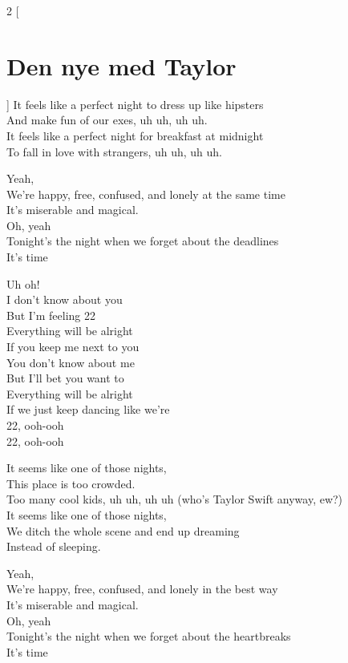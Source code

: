 \begin{multicols}{2}
[\section*{Den nye med Taylor}]
It feels like a perfect night to dress up like hipsters\\
And make fun of our exes, uh uh, uh uh.\\
It feels like a perfect night for breakfast at midnight\\
To fall in love with strangers, uh uh, uh uh.

Yeah,\\
We're happy, free, confused, and lonely at the same time\\
It's miserable and magical.\\
Oh, yeah\\
Tonight's the night when we forget about the deadlines\\
It's time

Uh oh!\\
I don't know about you\\
But I'm feeling 22\\
Everything will be alright\\
If you keep me next to you\\
You don't know about me\\
But I'll bet you want to\\
Everything will be alright\\
If we just keep dancing like we're\\
22, ooh-ooh\\
22, ooh-ooh

It seems like one of those nights,\\
This place is too crowded.\\
Too many cool kids, uh uh, uh uh (who's Taylor Swift anyway, ew?)\\
It seems like one of those nights,\\
We ditch the whole scene and end up dreaming\\
Instead of sleeping.

Yeah,\\
We're happy, free, confused, and lonely in the best way\\
It's miserable and magical.\\
Oh, yeah\\
Tonight's the night when we forget about the heartbreaks\\
It's time


\end{multicols}
